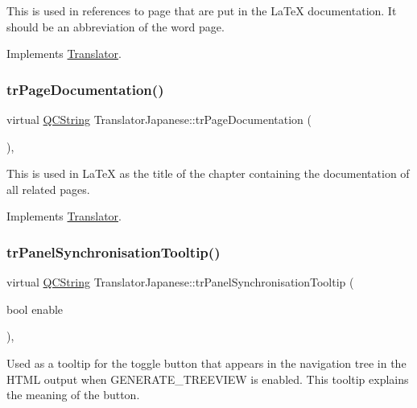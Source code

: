 This is used in references to page that are put in the La\+TeX documentation. It should be an abbreviation of the word page. 

Implements \mbox{\hyperlink{class_translator}{Translator}}.

\mbox{\label{class_translator_japanese_ab0a8b5e01ab4ffdc74dc646f62d3b5d6}} 
\subsubsection{\texorpdfstring{trPageDocumentation()}{trPageDocumentation()}}
{\footnotesize\ttfamily virtual \mbox{\hyperlink{class_q_c_string}{Q\+C\+String}} Translator\+Japanese\+::tr\+Page\+Documentation (\begin{DoxyParamCaption}{ }\end{DoxyParamCaption})\hspace{0.3cm}{\ttfamily [inline]}, {\ttfamily [virtual]}}

This is used in La\+TeX as the title of the chapter containing the documentation of all related pages. 

Implements \mbox{\hyperlink{class_translator}{Translator}}.

\mbox{\label{class_translator_japanese_a26c13eefdf17423eb2f7a04eb7416894}} 
\subsubsection{\texorpdfstring{trPanelSynchronisationTooltip()}{trPanelSynchronisationTooltip()}}
{\footnotesize\ttfamily virtual \mbox{\hyperlink{class_q_c_string}{Q\+C\+String}} Translator\+Japanese\+::tr\+Panel\+Synchronisation\+Tooltip (\begin{DoxyParamCaption}\item[{bool}]{enable }\end{DoxyParamCaption})\hspace{0.3cm}{\ttfamily [inline]}, {\ttfamily [virtual]}}

Used as a tooltip for the toggle button that appears in the navigation tree in the H\+T\+ML output when G\+E\+N\+E\+R\+A\+T\+E\+\_\+\+T\+R\+E\+E\+V\+I\+EW is enabled. This tooltip explains the meaning of the button. 

